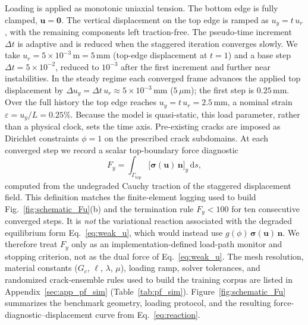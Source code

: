 \documentclass[10pt]{article}
\theoremstyle{definition}
\begin{document}
Loading is applied as monotonic uniaxial tension.
%
The bottom edge is fully clamped, $\mathbf{u}=\mathbf{0}$.
%
The vertical displacement on the top edge is ramped as $u_y = t\,u_r$, with the remaining components left traction-free.
%
The pseudo-time increment $\Delta t$ is adaptive and is reduced when the staggered iteration converges slowly.
%
We take $u_r=5\times10^{-3}\,\mathrm{m}=5\,\mathrm{mm}$ (top-edge displacement at $t=1$) and a base step $\Delta t=5\times10^{-2}$, reduced to $10^{-3}$ after the first increment and further near instabilities.
%
In the steady regime each converged frame advances the applied top displacement by $\Delta u_y=\Delta t\,u_r\approx5\times10^{-3}\,\mathrm{mm}$ ($5\,\mu\mathrm{m}$); the first step is $0.25\,\mathrm{mm}$.
%
Over the full history the top edge reaches $u_y=t\,u_r=2.5\,\mathrm{mm}$, a nominal strain $\varepsilon=u_y/L=0.25\%$.
%
Because the model is quasi-static, this load parameter, rather than a physical clock, sets the time axis.
%
Pre-existing cracks are imposed as Dirichlet constraints $\phi=1$ on the prescribed crack subdomains.
%
At each converged step we record a scalar top-boundary force diagnostic
%
\begin{equation}
    F_y = \int_{\Gamma_{\mathrm{top}}}
    \bigl[\boldsymbol{\sigma}(\mathbf{u})\,\mathbf{n}\bigr]_y\,\mathrm{d}s ,
    \label{eq:reaction}
\end{equation}
%
computed from the undegraded Cauchy traction of the staggered displacement field.
%
This definition matches the finite-element logging used to build Fig.~\ref{fig:schematic_Fu}(b) and the termination rule $F_y<100$ for ten consecutive converged steps.
%
It is \emph{not} the variational reaction associated with the degraded equilibrium form Eq.~\eqref{eq:weak_u}, which would instead use $g(\phi)\,\boldsymbol{\sigma}(\mathbf{u})\,\mathbf{n}$.
%
We therefore treat $F_y$ only as an implementation-defined load-path monitor and stopping criterion, not as the dual force of Eq.~\eqref{eq:weak_u}.
%
The mesh resolution, material constants ($G_c$, $\ell$, $\lambda$, $\mu$), loading ramp, solver tolerances, and randomized crack-ensemble rules used to build the training corpus are listed in Appendix~\ref{sec:app_pf_sim} (Table~\ref{tab:pf_sim}).
%
Figure~\ref{fig:schematic_Fu} summarizes the benchmark geometry, loading protocol, and the resulting force-diagnostic--displacement curve from Eq.~\eqref{eq:reaction}.
\end{document}
